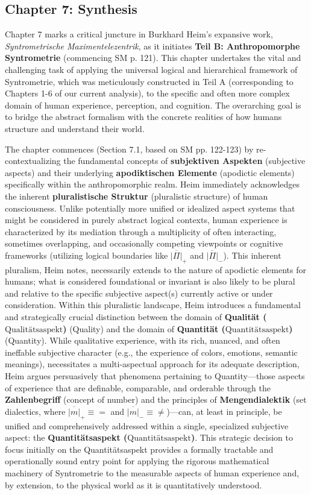 \documentclass[12pt]{article}
\newcommand{\quantitaetsaspekt}{\text{Quantitätsaspekt}}
\newcommand{\qualitaetsaspekt}{\text{Qualitätsaspekt}}
\begin{document}
\subsection{Chapter 7: Synthesis}
\label{sec:chapter7_synthesis}

Chapter 7 marks a critical juncture in Burkhard Heim's expansive work, \textit{Syntrometrische Maximentelezentrik}, as it initiates \textbf{Teil B: Anthropomorphe Syntrometrie} (commencing SM p. 121). This chapter undertakes the vital and challenging task of applying the universal logical and hierarchical framework of Syntrometrie, which was meticulously constructed in Teil A (corresponding to Chapters 1-6 of our current analysis), to the specific and often more complex domain of human experience, perception, and cognition. The overarching goal is to bridge the abstract formalism with the concrete realities of how humans structure and understand their world.

The chapter commences (Section 7.1, based on SM pp. 122-123) by re-contextualizing the fundamental concepts of \textbf{subjektiven Aspekten} (subjective aspects) and their underlying \textbf{apodiktischen Elemente} (apodictic elements) specifically within the anthropomorphic realm. Heim immediately acknowledges the inherent \textbf{pluralistische Struktur} (pluralistic structure) of human consciousness. Unlike potentially more unified or idealized aspect systems that might be considered in purely abstract logical contexts, human experience is characterized by its mediation through a multiplicity of often interacting, sometimes overlapping, and occasionally competing viewpoints or cognitive frameworks (utilizing logical boundaries like $\overline{|\Pi|}_+$ and $\overline{|\Pi|}_-$). This inherent pluralism, Heim notes, necessarily extends to the nature of apodictic elements for humans; what is considered foundational or invariant is also likely to be plural and relative to the specific subjective aspect(s) currently active or under consideration. Within this pluralistic landscape, Heim introduces a fundamental and strategically crucial distinction between the domain of \textbf{Qualität (\(\qualitaetsaspekt\))} (Quality) and the domain of \textbf{Quantität (\(\quantitaetsaspekt\))} (Quantity). While qualitative experience, with its rich, nuanced, and often ineffable subjective character (e.g., the experience of colors, emotions, semantic meanings), necessitates a multi-aspectual approach for its adequate description, Heim argues persuasively that phenomena pertaining to Quantity—those aspects of experience that are definable, comparable, and orderable through the \textbf{Zahlenbegriff} (concept of number) and the principles of \textbf{Mengendialektik} (set dialectics, where $\overline{|m|}_+ \equiv =$ and $\overline{|m|}_- \equiv \neq$)—can, at least in principle, be unified and comprehensively addressed within a single, specialized subjective aspect: the \textbf{Quantitätsaspekt (\(\quantitaetsaspekt\))}. This strategic decision to focus initially on the Quantitätsaspekt provides a formally tractable and operationally sound entry point for applying the rigorous mathematical machinery of Syntrometrie to the measurable aspects of human experience and, by extension, to the physical world as it is quantitatively understood.
\end{document}
